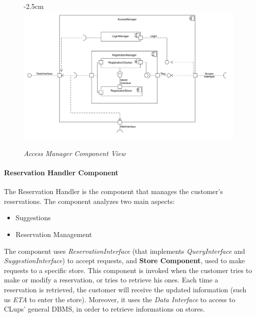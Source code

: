 \documentclass{article}
\begin{document}
				\begin{figure}[h]
					\begin{adjustwidth} {-2.5cm}{}
						\centering
						\includegraphics[scale=0.45]{Component Diagrams/AccessManagerComponentView.pdf}\\
					\end{adjustwidth}
					\caption{\emph{Access Manager Component View}}
				\end{figure}
				\newpage
				
			\paragraph{Reservation Handler Component}
				The Reservation Handler is the component that manages the customer’s reservations. The component analyzes two main aspects:
				
				\begin{itemize}
					\item Suggestions
					\item Reservation Management
				\end{itemize}
			
				The component uses \emph{ReservationInterface} (that implements \emph{QueryInterface} and \emph{SuggestionInterface}) to accept requests, and {\bfseries Store Component}, used to make requests to a specific store.
				This component is invoked when the customer tries to make or modify a reservation, or tries to retrieve his ones. Each time a reservation is retrieved, the customer will receive the updated information (such us \emph{ETA} to enter the store). Moreover, it uses the \emph{Data Interface} to access to CLups' general DBMS, in order to retrieve informations on stores.
				
\end{document}

